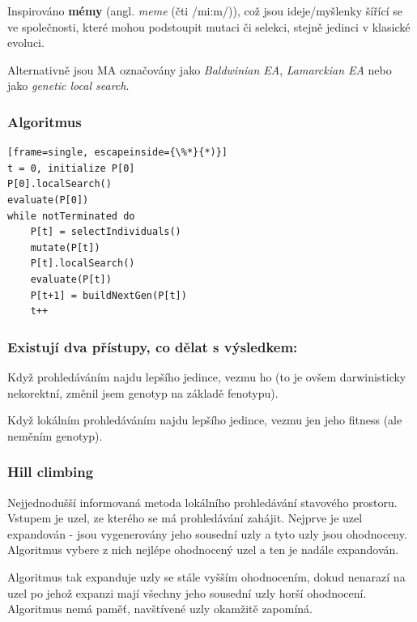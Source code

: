 Inspirováno \textbf{mémy} (angl. \textit{meme} (čti /mi:m/)), což jsou ideje/myšlenky šířící se ve společnosti, které mohou podstoupit mutaci či selekci, stejně jedinci v klasické evoluci. 

Alternativně jsou MA označovány jako \textit{Baldwinian EA}, \textit{Lamarckian EA} nebo jako \textit{genetic local search}.

\subsubsection{Algoritmus}
\begin{minipage}{\linewidth}
	\begin{lstlisting}[frame=single, escapeinside={\%*}{*)}]
t = 0, initialize P[0]
P[0].localSearch()
evaluate(P[0])
while notTerminated do
	P[t] = selectIndividuals()
	mutate(P[t])
	P[t].localSearch()
	evaluate(P[t])
	P[t+1] = buildNextGen(P[t])
	t++

	\end{lstlisting}
\end{minipage}

\subsubsection{Existují dva přístupy, co dělat s výsledkem:}
\begin{description}
	\leftskip 20pt
	\setlength{\itemsep}{0pt}
	\item[Lamarckismus] Když prohledáváním najdu lepšího jedince, vezmu ho (to je ovšem darwinisticky nekorektní, změnil jsem genotyp na základě fenotypu).
	\item[Baldwinismus] Když lokálním prohledáváním najdu lepšího jedince, vezmu jen jeho fitness (ale neměním genotyp).
\end{description}


\subsubsection{Hill climbing}
Nejjednodušší informovaná metoda lokálního prohledávání stavového prostoru. Vstupem je uzel, ze kterého se má prohledávání zahájit. Nejprve je uzel expandován - jsou vygenerovány jeho sousední uzly a tyto uzly jsou ohodnoceny. Algoritmus vybere z nich nejlépe ohodnocený uzel a ten je nadále expandován. 

Algoritmus tak expanduje uzly se stále vyšším ohodnocením, dokud nenarazí na uzel po jehož expanzi mají všechny jeho sousední uzly horší ohodnocení. Algoritmus nemá paměť, navštívené uzly okamžitě zapomíná.

